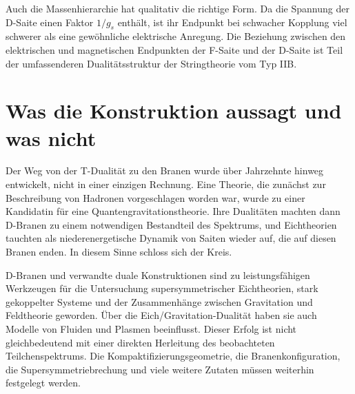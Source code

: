 Auch die Massenhierarchie hat qualitativ die richtige Form. Da die Spannung der D-Saite einen Faktor \(1/g_s\) enthält, ist ihr Endpunkt bei schwacher Kopplung viel schwerer als eine gewöhnliche elektrische Anregung. Die Beziehung zwischen den elektrischen und magnetischen Endpunkten der F-Saite und der D-Saite ist Teil der umfassenderen Dualitätsstruktur der Stringtheorie vom Typ IIB.

\begin{classroomqa}
\end{classroomqa}

\section{Was die Konstruktion aussagt und was nicht}

Der Weg von der T-Dualität zu den Branen wurde über Jahrzehnte hinweg entwickelt, nicht in einer einzigen Rechnung. Eine Theorie, die zunächst zur Beschreibung von Hadronen vorgeschlagen worden war, wurde zu einer Kandidatin für eine Quantengravitationstheorie. Ihre Dualitäten machten dann D-Branen zu einem notwendigen Bestandteil des Spektrums, und Eichtheorien tauchten als niederenergetische Dynamik von Saiten wieder auf, die auf diesen Branen enden. In diesem Sinne schloss sich der Kreis.

D-Branen und verwandte duale Konstruktionen sind zu leistungsfähigen Werkzeugen für die Untersuchung supersymmetrischer Eichtheorien, stark gekoppelter Systeme und der Zusammenhänge zwischen Gravitation und Feldtheorie geworden. Über die Eich/Gravitation-Dualität haben sie auch Modelle von Fluiden und Plasmen beeinflusst. Dieser Erfolg ist nicht gleichbedeutend mit einer direkten Herleitung des beobachteten Teilchenspektrums. Die Kompaktifizierungsgeometrie, die Branenkonfiguration, die Supersymmetriebrechung und viele weitere Zutaten müssen weiterhin festgelegt werden.

\begin{classroomqa}
\end{classroomqa}

